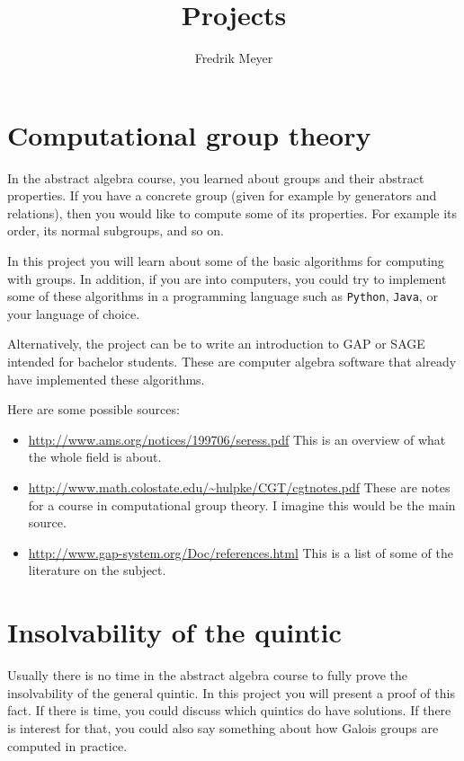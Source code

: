 \documentclass[11pt, english, a4paper]{article}
\begin{document}
\title{Projects}
\author{Fredrik Meyer}
\maketitle 

\section{Computational group theory}

In the abstract algebra course, you learned about groups and their abstract properties. If you have a concrete group (given for example by generators and relations), then you would like to compute some of its properties. For example its order, its normal subgroups, and so on.

In this project you will learn about some of the basic algorithms for computing with groups. In addition, if you are into computers, you could try to implement some of these algorithms in a programming language such as \texttt{Python}, \texttt{Java}, or your language of choice.

Alternatively, the project can be to write an introduction to GAP or SAGE intended for bachelor students. These are computer algebra software that already have implemented these algorithms.

Here are some possible sources:

\begin{itemize}
\item \url{http://www.ams.org/notices/199706/seress.pdf} This is an overview of what the whole field is about.
\item \url{http://www.math.colostate.edu/~hulpke/CGT/cgtnotes.pdf} These are notes for a course in computational group theory. I imagine this would be the main source.
\item \url{http://www.gap-system.org/Doc/references.html} This is a list of some of the literature on the subject.
\end{itemize}


\section{Insolvability of the quintic}

Usually there is no time in the abstract algebra course to fully prove the insolvability of the general quintic. In this project you will present a proof of this fact. If there is time, you could discuss which quintics do have solutions. If there is interest for that, you could also say something about how Galois groups are computed in practice.
\end{document}
